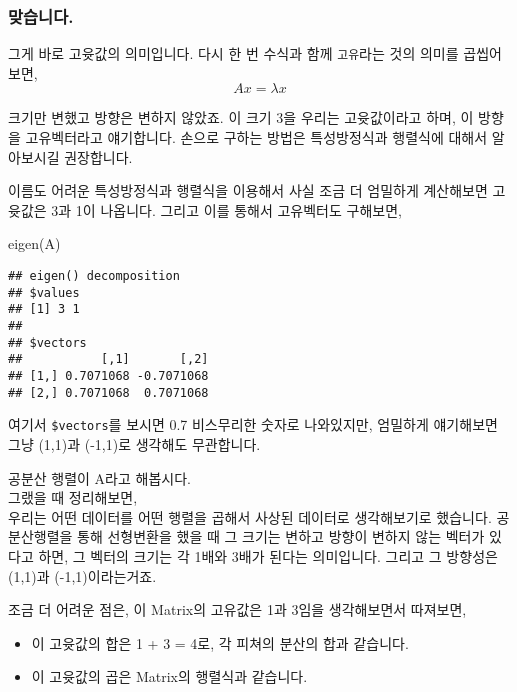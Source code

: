 \documentclass[
]{article}
\newenvironment{Shaded}{\begin{snugshade}}{\end{snugshade}}
\newcommand{\FunctionTok}[1]{\textcolor[rgb]{0.00,0.00,0.00}{#1}}
\newcommand{\NormalTok}[1]{#1}
\providecommand{\tightlist}{%
  \setlength{\itemsep}{0pt}\setlength{\parskip}{0pt}}
\begin{document}
\hypertarget{uxb9deuxc2b5uxb2c8uxb2e4.}{%
\subsubsection{맞습니다.}\label{uxb9deuxc2b5uxb2c8uxb2e4.}}

그게 바로 고윳값의 의미입니다. 다시 한 번 수식과 함께 \texttt{고유}라는
것의 의미를 곱씹어보면, \[
Ax = \lambda x
\]

크기만 변했고 방향은 변하지 않았죠. 이 크기 3을 우리는 고윳값이라고
하며, 이 방향을 고유벡터라고 얘기합니다. 손으로 구하는 방법은
특성방정식과 행렬식에 대해서 알아보시길 권장합니다.

이름도 어려운 특성방정식과 행렬식을 이용해서 사실 조금 더 엄밀하게
계산해보면 고윳값은 3과 1이 나옵니다. 그리고 이를 통해서 고유벡터도
구해보면,

\begin{Shaded}
\begin{Highlighting}[]
\FunctionTok{eigen}\NormalTok{(A)}
\end{Highlighting}
\end{Shaded}

\begin{verbatim}
## eigen() decomposition
## $values
## [1] 3 1
## 
## $vectors
##           [,1]       [,2]
## [1,] 0.7071068 -0.7071068
## [2,] 0.7071068  0.7071068
\end{verbatim}

여기서 \texttt{\$vectors}를 보시면 0.7 비스무리한 숫자로 나와있지만,
엄밀하게 얘기해보면 그냥 (1,1)과 (-1,1)로 생각해도 무관합니다.

공분산 행렬이 A라고 해봅시다.\\
그랬을 때 정리해보면,\\
우리는 어떤 데이터를 어떤 행렬을 곱해서 사상된 데이터로 생각해보기로
했습니다. 공분산행렬을 통해 선형변환을 했을 때 그 크기는 변하고 방향이
변하지 않는 벡터가 있다고 하면, 그 벡터의 크기는 각 1배와 3배가 된다는
의미입니다. 그리고 그 방향성은 (1,1)과 (-1,1)이라는거죠.

조금 더 어려운 점은, 이 Matrix의 고유값은 1과 3임을 생각해보면서
따져보면,

\begin{itemize}
\tightlist
\item
  이 고윳값의 합은 1 + 3 = 4로, 각 피쳐의 분산의 합과 같습니다.\\
\item
  이 고윳값의 곱은 Matrix의 행렬식과 같습니다.
\end{itemize}
\end{document}
